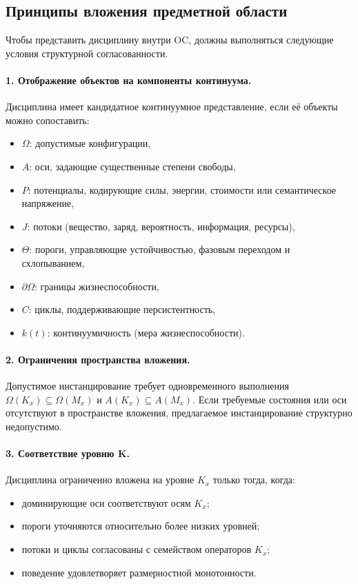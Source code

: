 \subsection{Принципы вложения предметной области}

Чтобы представить дисциплину внутри OC, должны выполняться следующие
условия структурной согласованности.

\paragraph{1. Отображение объектов на компоненты континуума.}
Дисциплина имеет кандидатное континуумное представление, если её объекты
можно сопоставить:
\begin{itemize}
  \item \(\Omega\): допустимые конфигурации,
  \item \(A\): оси, задающие существенные степени свободы,
  \item \(P\): потенциалы, кодирующие силы, энергии, стоимости или
        семантическое напряжение,
  \item \(J\): потоки (вещество, заряд, вероятность, информация,
        ресурсы),
  \item \(\Theta\): пороги, управляющие устойчивостью, фазовым переходом и
        схлопыванием,
  \item \(\partial\Omega\): границы жизнеспособности,
  \item \(C\): циклы, поддерживающие персистентность,
  \item \(k(t)\): континуумичность (мера жизнеспособности).
\end{itemize}

\paragraph{2. Ограничения пространства вложения.}
Допустимое инстанцирование требует одновременного выполнения
\(\Omega(K_x)\subseteq\Omega(M_x)\) и
\(A(K_x)\subseteq A(M_x)\). Если требуемые состояния или оси отсутствуют
в пространстве вложения, предлагаемое инстанцирование структурно недопустимо.

\paragraph{3. Соответствие уровню K.}
Дисциплина ограниченно вложена на уровне \(K_x\) только тогда, когда:
\begin{itemize}
  \item доминирующие оси соответствуют осям \(K_x\);
  \item пороги уточняются относительно более низких уровней;
  \item потоки и циклы согласованы с семейством операторов \(K_x\);
  \item поведение удовлетворяет размерностной монотонности.
\end{itemize}

